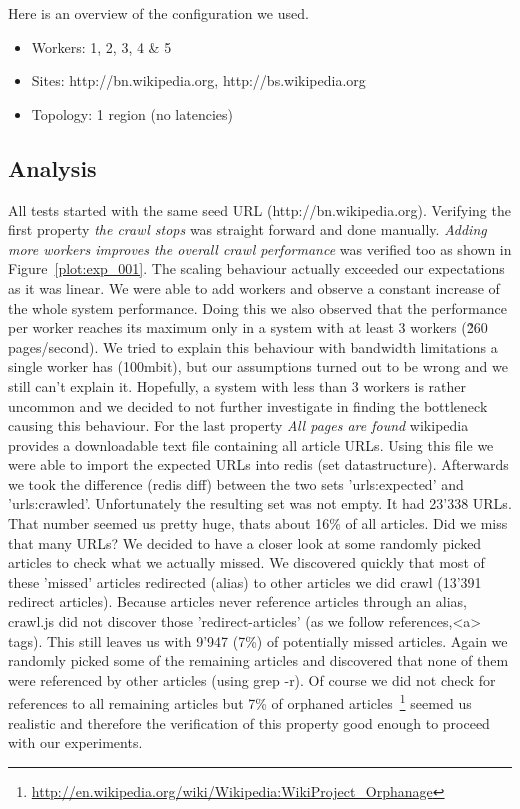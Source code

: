 Here is an overview of the configuration we used.

\begin{itemize}
  \item Workers: 1, 2, 3, 4 \& 5
  \item Sites: http://bn.wikipedia.org, http://bs.wikipedia.org
  \item Topology: 1 region (no latencies)
\end{itemize}

\subsection{Analysis}

All tests started with the same seed URL (http://bn.wikipedia.org). Verifying the first property \emph{the crawl stops} was straight forward and done manually. \emph{Adding more workers improves the overall crawl performance} was verified too as shown in Figure~\ref{plot:exp_001}. The scaling behaviour actually exceeded our expectations as it was linear. We were able to add workers and observe a constant increase of the whole system performance. Doing this we also observed that the performance per worker reaches its maximum only in a system with at least 3 workers (\~260 pages/second). We tried to explain this behaviour with bandwidth limitations a single worker has (100mbit), but our assumptions turned out to be wrong and we still can't explain it. Hopefully, a system with less than 3 workers is rather uncommon and we decided to not further investigate in finding the bottleneck causing this behaviour.
\newline
\newline
For the last property \emph{All pages are found} wikipedia provides a downloadable text file containing all article URLs. Using this file we were able to import the expected URLs into redis (set datastructure). Afterwards we took the difference (redis diff) between the two sets 'urls:expected' and 'urls:crawled'. Unfortunately the resulting set was not empty. It had 23'338 URLs. That number seemed us pretty huge, thats about 16\% of all articles. Did we miss that many URLs? We decided to have a closer look at some randomly picked articles to check what we actually missed. We discovered quickly that most of these 'missed' articles redirected (alias) to other articles we did crawl (13'391 redirect articles). Because articles never reference articles through an alias, crawl.js did not discover those 'redirect-articles' (as we follow references,<a> tags). This still leaves us with 9'947 (7\%) of potentially missed articles. Again we randomly picked some of the remaining articles and discovered that none of them were referenced by other articles (using grep -r). Of course we did not check for references to all remaining articles but 7\% of orphaned articles~\footnote{\url{http://en.wikipedia.org/wiki/Wikipedia:WikiProject_Orphanage}} seemed us realistic and therefore the verification of this property good enough to proceed with our experiments.
